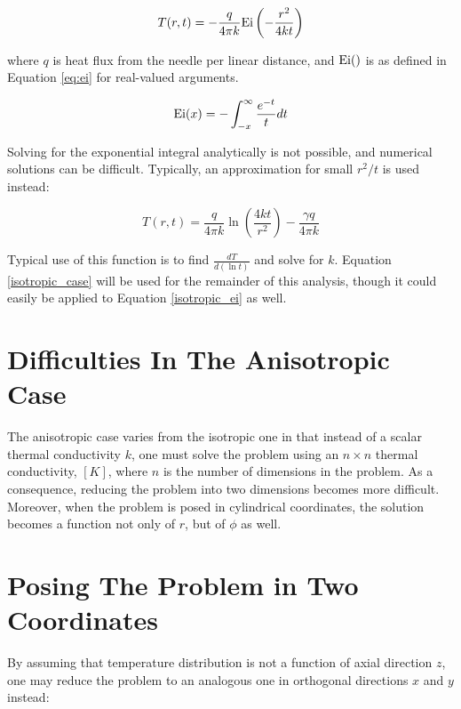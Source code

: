 \begin{equation}
\label{isotropic_ei}
T(r,t) = - \frac{q}{4\pi k}\textrm{Ei}\left(-\frac{r^2}{4kt}\right)
\end{equation}

where \(q\) is heat flux from the needle per linear distance, and \(\textrm{Ei}()\) is
as defined in Equation \ref{eq:ei} for real-valued arguments.

\begin{equation}
\label{eq:ei}
\textrm{Ei}(x) = -\int_{-x}^{\infty} \frac{e^{-t}}{t}dt
\end{equation}

Solving for the exponential integral analytically is not possible, and numerical
solutions can be difficult. Typically, an approximation for small
\(r^2/t\) is used instead:

\begin{equation}
\label{isotropic_case}
T(r,t) = \frac{q}{4\pi k}\ln\left(\frac{4kt}{r^2}\right) - \frac{\gamma q}{4\pi k}
\end{equation}

Typical use of this function is to find \(\frac{dT}{d(\ln t)}\) and solve
for \(k\). Equation \ref{isotropic_case} will be used for the remainder of
this analysis, though it could easily be applied to Equation \ref{isotropic_ei} as well.


\section{Difficulties In The Anisotropic Case}
\label{sec:analytical-np:anisotropic-diff}


The anisotropic case varies from the isotropic one in that instead of a scalar 
thermal conductivity \(k\), one must solve the problem using an \(n \times n\)
thermal conductivity, \([K]\), where \(n\) is the number of dimensions in the
problem. As a consequence, reducing the problem into two dimensions becomes more
difficult. Moreover, when the problem is posed in cylindrical coordinates, the
solution becomes a function not only of \(r\), but of \(\phi\) as well.

\section{Posing The Problem in Two Coordinates}
\label{sec:analytical-np:2D}

By assuming that temperature distribution is not a function of axial direction
\(z\), one may reduce the problem to an analogous one in orthogonal directions
\(x\) and \(y\) instead:

